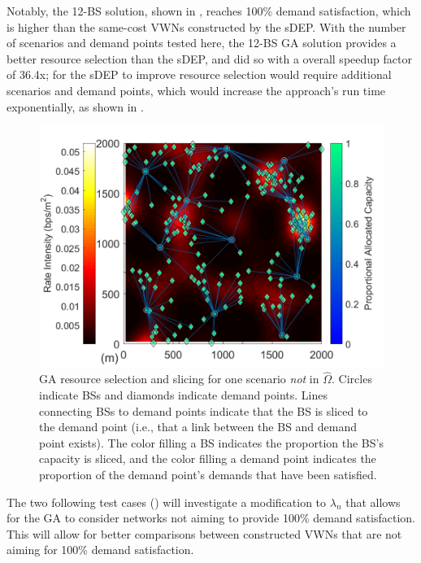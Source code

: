 \documentclass[12pt,dvipsnames]{report}
\begin{document}
Notably, the 12-BS solution, shown in , reaches 100\% demand satisfaction, which is higher than the same-cost VWNs constructed by the sDEP.  With the number of scenarios and demand points tested here, the 12-BS GA solution provides a better resource selection than the sDEP, and did so with a overall speedup factor of 36.4x; for the sDEP to improve resource selection would require additional scenarios and demand points, which would increase the approach's run time exponentially, as shown in .

\begin{figure}[htp]
	\centering
	\includegraphics[height=0.4\textheight]{Figures/Prelim_VoronoiDemandAllocation_GA_12BS}
	\caption[One GA resource selection and slicing solution for the preliminary simulations]{GA resource selection and slicing for one scenario \emph{not} in $\hat{\Omega}$.  Circles indicate BSs and diamonds indicate demand points.  Lines connecting BSs to demand points indicate that the BS is sliced to the demand point (i.e., that a link between the BS and demand point exists).  The color filling a BS indicates the proportion the BS's capacity is sliced, and the color filling a demand point indicates the proportion of the demand point's demands that have been satisfied.}
	\label{fig:Prelim_VorDemAlloc_GA}
\end{figure}

The two following test cases () will investigate a modification to $\lambda_n$ that allows for the GA to consider networks not aiming to provide 100\% demand satisfaction.  This will allow for better comparisons between constructed VWNs that are not aiming for 100\% demand satisfaction.
\end{document}
